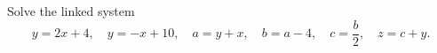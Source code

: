 Solve the linked system
\[y=2x+4,\quad y=-x+10,\quad a=y+x,\quad b=a-4,\quad c=\dfrac{b}{2},\quad z=c+y.\]
